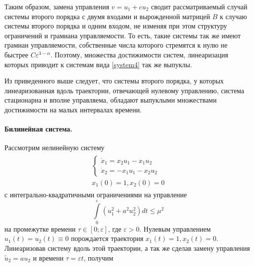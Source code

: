 \documentclass[../main.tex]{subfiles}
\begin{document}
 Таким образом, замена управления $ v = u_1 + c u_2 $ сводит рассматриваемый случай системы второго порядка с двумя входами и вырожденной матрицей $ B $ к случаю системы второго порядка и одним входом, не изменяя при этом структуру ограничений и грамиана управляемости. То есть, такие системы так же имеют грамиан управляемости, собственные числа которого стремятся к нулю не быстрее $ C \varepsilon^{3-\alpha} $. Поэтому, множества достижимости систем, линеаризация которых приводит к системам вида \eqref{system4} так же выпуклы.
 
 Из приведенного выше следует, что системы второго порядка, у которых линеаризованная вдоль траектории, отвечающей нулевому управлению, система стационарна и вполне управляема,  обладают выпуклыми множествами достижимости на малых интервалах времени.
 \paragraph{Билинейная система.}
 Рассмотрим нелинейную систему
 \begin{gather}\label{system5}
	 \begin{gathered}
		 \left\{ {\begin{array}{*{20}{l}}
				 {\dot{x}_1 =  x_2 u_1 - x_1 u_2}\\
				 {\dot{x}_2 =  -x_1 u_1 - x_2 u_2}
		 \end{array}} \right.
		 \\
		 x_1(0) = 1, x_2(0) = 0
	 \end{gathered}
 \end{gather}
 с интегрально-квадратичными ограничениями на управление
 \begin{equation*}
	 \int \limits_0^{\varepsilon} \left( u_1^2 + a^2 u_2^2\right) dt \leq \mu^2
 \end{equation*} 	
 на промежутке времени $ \tau \in \left[0;\varepsilon \right] $, где $ \varepsilon > 0 $. Нулевым управлением $  u_1(t) = u_2(t) \equiv 0 $ порождается траектория $ x_1(t) = 1, x_2(t) = 0 $. Линеаризовав систему вдоль этой траектории, а так же сделав замену управления $ {\tilde u_2} = a u_2 $ и времени  $ \tau =\varepsilon t$, получим
\end{document}
